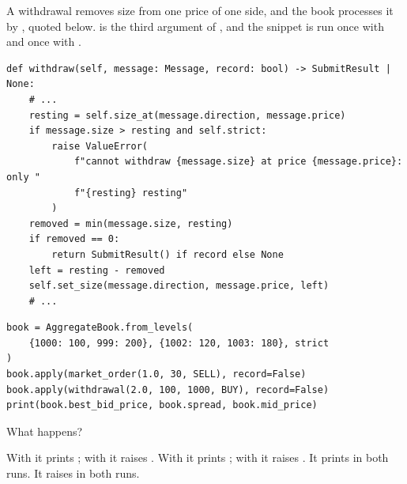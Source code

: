 \begin{question}
\label{question.withdrawalBeyondTheRestingSize}
A withdrawal removes size from one price of one side,
and the book processes it by , quoted below.
 is the third argument of ,
and the snippet is run once with  and once with .
\begin{lstlisting}[caption={\protect\codehl{unito26.lob.orderbook.AggregateBook.withdraw}, abridged.}, label=listing.withdrawalBeyondTheRestingSizeWithdraw]
def withdraw(self, message: Message, record: bool) -> SubmitResult | None:
    # ...
    resting = self.size_at(message.direction, message.price)
    if message.size > resting and self.strict:
        raise ValueError(
            f"cannot withdraw {message.size} at price {message.price}: only "
            f"{resting} resting"
        )
    removed = min(message.size, resting)
    if removed == 0:
        return SubmitResult() if record else None
    left = resting - removed
    self.set_size(message.direction, message.price, left)
    # ...
\end{lstlisting}
\begin{lstlisting}[caption={A fill, then a withdrawal}, label=listing.withdrawalBeyondTheRestingSizeRun]
book = AggregateBook.from_levels(
    {1000: 100, 999: 200}, {1002: 120, 1003: 180}, strict
)
book.apply(market_order(1.0, 30, SELL), record=False)
book.apply(withdrawal(2.0, 100, 1000, BUY), record=False)
print(book.best_bid_price, book.spread, book.mid_price)
\end{lstlisting}
What happens?
\begin{choices}
 \correctchoice With  it prints ;
  with  it raises .
 \choice With  it prints ;
  with  it raises .
 \choice It prints  in both runs.
 \choice It raises  in both runs.
\end{choices}
\end{question}

